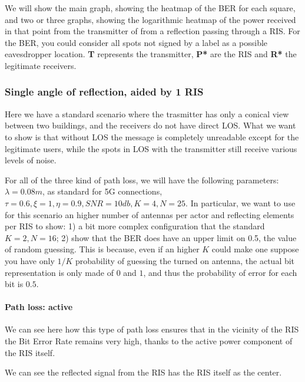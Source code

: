 We will show the main graph, showing the heatmap of the BER for each square, and two or three graphs, showing the logarithmic heatmap of the power received in that point from the transmitter of from a reflection passing through a RIS. For the BER, you could consider all spots not signed by a label as a possible eavesdropper location. \textbf{T} represents the transmitter, \textbf{P*} are the RIS and \textbf{R*} the legitimate receivers.

\subsubsection{Single angle of reflection, aided by 1 RIS}

Here we have a standard scenario where the trasmitter has only a conical view between two buildings, and the receivers do not have direct LOS. What we want to show is that without LOS the message is completely unreadable except for the legitimate users, while the spots in LOS with the transmitter still receive various levels of noise.

For all of the three kind of path loss, we will have the following parameters: $\lambda = 0.08m$, as standard for 5G connections, $ \tau = 0.6, \xi = 1, \eta = 0.9, SNR = 10db, K = 4, N = 25$. In particular, we want to use for this scenario an higher number of antennas per actor and reflecting elements per RIS to show: 1) a bit more complex configuration that the standard $K = 2, N = 16$; 2) show that the BER does have an upper limit on 0.5, the value of random guessing. This is because, even if an higher $K$ could make one suppose you have only $1/K$ probability of guessing the turned on antenna, the actual bit representation is only made of $0$ and $1$, and thus the probability of error for each bit is $0.5$.

\paragraph*{Path loss: active}

We can see here how this type of path loss ensures that in the vicinity of the RIS the Bit Error Rate remains very high, thanks to the active power component of the RIS itself.

We can see the reflected signal from the RIS has the RIS itself as the center.


